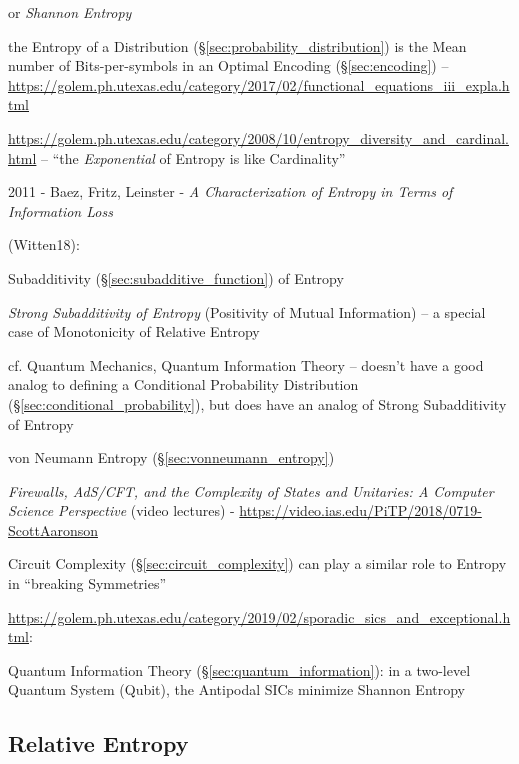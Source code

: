 or \emph{Shannon Entropy}

the Entropy of a Distribution (\S\ref{sec:probability_distribution})
is the Mean number of Bits-per-symbols in an Optimal Encoding
(\S\ref{sec:encoding}) --
\url{https://golem.ph.utexas.edu/category/2017/02/functional_equations_iii_expla.html}

\url{https://golem.ph.utexas.edu/category/2008/10/entropy_diversity_and_cardinal.html}
-- ``the \emph{Exponential} of Entropy is like Cardinality''

2011 - Baez, Fritz, Leinster - \emph{A Characterization of Entropy in Terms of
  Information Loss}

\asterism

(Witten18):

Subadditivity (\S\ref{sec:subadditive_function}) of Entropy

\emph{Strong Subadditivity of Entropy} (Positivity of Mutual Information) --
a special case of Monotonicity of Relative Entropy

cf. Quantum Mechanics, Quantum Information Theory
-- doesn't have a good analog to defining a Conditional Probability Distribution
(\S\ref{sec:conditional_probability}), but does have an analog of Strong
Subadditivity of Entropy

\fist von Neumann Entropy (\S\ref{sec:vonneumann_entropy})

\asterism

\emph{Firewalls, AdS/CFT, and the Complexity of States and Unitaries: A Computer
  Science Perspective}
(video lectures)
-
\url{https://video.ias.edu/PiTP/2018/0719-ScottAaronson}

Circuit Complexity (\S\ref{sec:circuit_complexity}) can play a similar role to
Entropy in ``breaking Symmetries''

\asterism

\url{https://golem.ph.utexas.edu/category/2019/02/sporadic_sics_and_exceptional.html}:

Quantum Information Theory (\S\ref{sec:quantum_information}): in a two-level
Quantum System (Qubit), the Antipodal SICs minimize Shannon Entropy



\subsection{Relative Entropy}\label{sec:relative_entropy}

